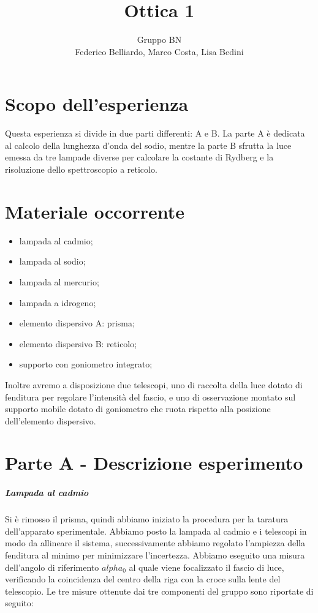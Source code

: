 \documentclass[10pt,a4paper]{article}
\author{Gruppo BN \\ Federico Belliardo, Marco Costa, Lisa Bedini}
\title{Ottica 1}
\begin{document}
\maketitle
\section{Scopo dell'esperienza}
Questa esperienza si divide in due parti differenti: A e B.
La parte A è dedicata al calcolo della lunghezza d'onda del sodio, mentre la parte B sfrutta la luce emessa da tre lampade diverse per calcolare la costante di Rydberg e la risoluzione dello spettroscopio a reticolo.\\

\section{Materiale occorrente}
\begin{itemize}
\item lampada al cadmio;
\item lampada al sodio;
\item lampada al mercurio;
\item lampada a idrogeno;
\item elemento dispersivo A: prisma;
\item elemento dispersivo B: reticolo;
\item supporto con goniometro integrato;
\end{itemize}
Inoltre avremo a disposizione due telescopi, uno di raccolta della luce dotato di fenditura per regolare l'intensità del fascio, e uno di osservazione montato sul supporto mobile dotato di goniometro che ruota rispetto alla posizione dell'elemento dispersivo.\\
\section{Parte A - Descrizione esperimento}
\subparagraph{Lampada al cadmio}
Si è rimosso il prisma, quindi abbiamo iniziato la procedura per la taratura dell'apparato sperimentale. Abbiamo posto la lampada al cadmio e i telescopi in modo da allineare il sistema, successivamente abbiamo regolato l'ampiezza della fenditura al minimo per minimizzare l'incertezza. Abbiamo eseguito una misura dell'angolo di riferimento $alpha_0$ al quale viene focalizzato il fascio di luce, verificando la coincidenza del centro della riga con la croce sulla lente del telescopio. Le tre misure ottenute dai tre componenti del gruppo sono riportate di seguito:
\end{document}

